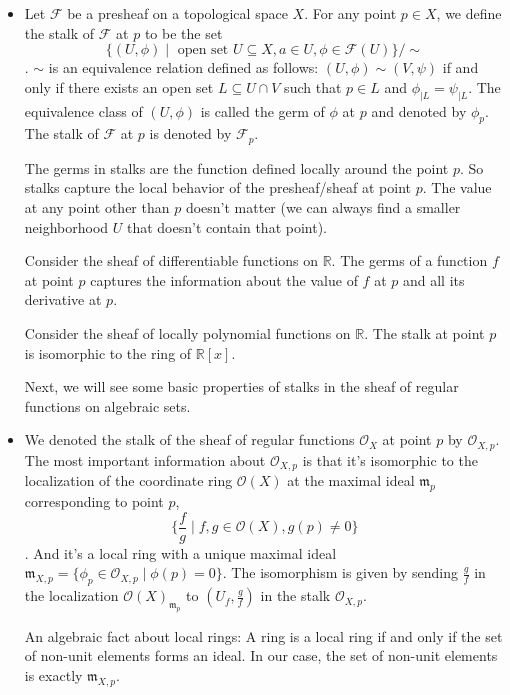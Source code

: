 \documentclass[15pt]{scrartcl}
\newcommand{\R}{\mathbb{R}}
\newcommand{\cF}{\mathcal{F}}
\newcommand{\cO}{\mathcal{O}}
\newcommand{\maxideal}{\mathfrak{m}}
\begin{document}
\begin{itemize}
    \subsection{Stalks and germs}
    \item Let $\cF$ be a presheaf on a topological space $X$. For any point $p\in X$, we define the stalk of $\cF$ at $p$ to be the set \[\{(U,\phi)\mid \text{ open set }U\subseteq X, a\in U, \phi\in \cF(U) \}/\sim\]. $\sim$ is an equivalence relation defined as follows: $(U,\phi)\sim (V,\psi)$ if and only if there exists an open set $L \subseteq U\cap V$ such that $p\in L$ and $\phi_{\mid L}=\psi_{\mid L}$. The equivalence class of $(U,\phi)$ is called the germ of $\phi$ at $p$ and denoted by $\phi_p$. The stalk of $\cF$ at $p$ is denoted by $\cF_p$.
    \begin{remark}
        The germs in stalks are the function defined locally around the point $p$. So stalks capture the local behavior of the presheaf/sheaf at point $p$. The value at any point other than $p$ doesn't matter (we can always find a smaller neighborhood $U$ that doesn't contain that point).
    \end{remark}
    \begin{example}
        Consider the sheaf of differentiable functions on $\R$. The germs of a function $f$ at point $p$ captures the information about the value of $f$ at $p$ and all its derivative at $p$. 
    \end{example}
    \begin{example}
        Consider the sheaf of locally polynomial functions on $\R$. The stalk at point $p$ is isomorphic to the ring of $\R[x]$.
    \end{example}
    Next, we will see some basic properties of stalks in the sheaf of regular functions on algebraic sets.
    \item We denoted the stalk of the sheaf of regular functions $\cO_X$ at point $p$ by $\cO_{X,p}$. The most important information about $\cO_{X,p}$ is that it's isomorphic to the localization of the coordinate ring $\cO(X)$ at the maximal ideal $\maxideal_p$ corresponding to point $p$, \[\{\frac{f}{g}\mid f,g\in \cO(X), g(p)\neq 0\}\]. And it's a local ring with a unique maximal ideal $\maxideal_{X,p}=\{\phi_p\in \cO_{X,p}\mid \phi(p)=0\}$. The isomorphism is given by sending $\frac{g}{f}$ in the localization $\cO(X)_{\maxideal_p}$ to $(U_f, \frac{g}{f})$ in the stalk $\cO_{X,p}$. 
    \begin{remark}
        An algebraic fact about local rings: A ring is a local ring if and only if the set of non-unit elements forms an ideal. In our case, the set of non-unit elements is exactly $\maxideal_{X,p}$.
    \end{remark}
    \end{itemize}
\newpage
\end{document}
